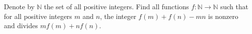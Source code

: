 Denote by $\mathbb{N}$ the set of all positive integers. Find all functions $f : \mathbb{N} \to \mathbb{N}$ such that for all positive integers $m$ and $n$, the integer $f(m) + f(n) - mn$ is nonzero and divides $mf(m) + nf(n)$.
